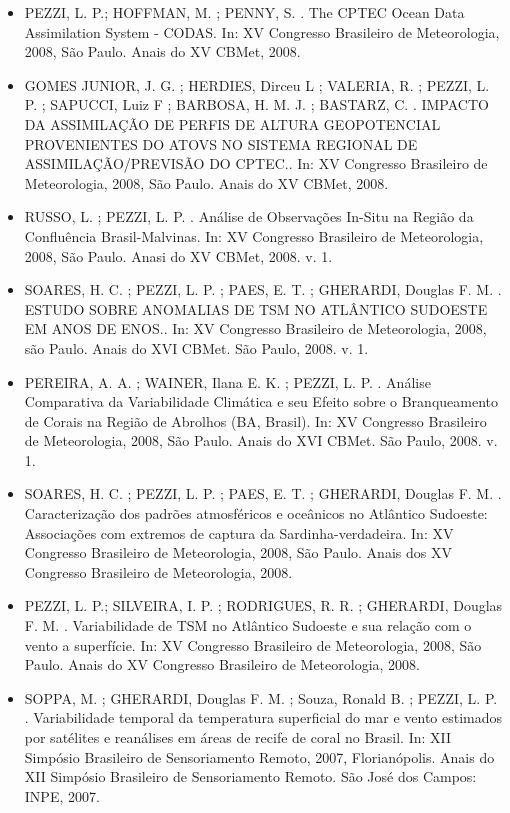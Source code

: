 \documentclass[11pt, a4paper]{awesome-cv}
\begin{document}
\begin{cvletter}
\begin{itemize}
  \item[] PEZZI, L. P.; HOFFMAN, M. ; PENNY, S. . The CPTEC Ocean Data Assimilation System - CODAS. In: XV Congresso Brasileiro de Meteorologia, 2008, São Paulo. Anais do XV CBMet, 2008.
  \item[] GOMES JUNIOR, J. G. ; HERDIES, Dirceu L ; VALERIA, R. ; PEZZI, L. P. ; SAPUCCI, Luiz F ; BARBOSA, H. M. J. ; BASTARZ, C. . IMPACTO DA ASSIMILAÇÃO DE PERFIS DE ALTURA GEOPOTENCIAL PROVENIENTES DO ATOVS NO SISTEMA REGIONAL DE ASSIMILAÇÃO/PREVISÃO DO CPTEC.. In: XV Congresso Brasileiro de Meteorologia, 2008, São Paulo. Anais do XV CBMet, 2008. 
  \item[] RUSSO, L. ; PEZZI, L. P. . Análise de Observações In-Situ na Região da Confluência Brasil-Malvinas. In: XV Congresso Brasileiro de Meteorologia, 2008, São Paulo. Anasi do XV CBMet, 2008. v. 1. 
  \item[] SOARES, H. C. ; PEZZI, L. P. ; PAES, E. T. ; GHERARDI, Douglas F. M. . ESTUDO SOBRE ANOMALIAS DE TSM NO ATLÂNTICO SUDOESTE EM ANOS DE ENOS.. In: XV Congresso Brasileiro de Meteorologia, 2008, são Paulo. Anais do XVI CBMet. São Paulo, 2008. v. 1. 
  \item[] PEREIRA, A. A. ; WAINER, Ilana E. K. ; PEZZI, L. P. . Análise Comparativa da Variabilidade Climática e seu Efeito sobre o Branqueamento de Corais na Região de Abrolhos (BA, Brasil). In: XV Congresso Brasileiro de Meteorologia, 2008, São Paulo. Anais do XVI CBMet. São Paulo, 2008. v. 1.
  \item[] SOARES, H. C. ; PEZZI, L. P. ; PAES, E. T. ; GHERARDI, Douglas F. M. . Caracterização dos padrões atmosféricos e oceânicos no Atlântico Sudoeste: Associações com extremos de captura da Sardinha-verdadeira. In: XV Congresso Brasileiro de Meteorologia, 2008, São Paulo. Anais dos XV Congresso Brasileiro de Meteorologia, 2008.
  \item[] PEZZI, L. P.; SILVEIRA, I. P. ; RODRIGUES, R. R. ; GHERARDI, Douglas F. M. . Variabilidade de TSM no Atlântico Sudoeste e sua relação com o vento a superfície. In: XV Congresso Brasileiro de Meteorologia, 2008, São Paulo. Anais do XV Congresso Brasileiro de Meteorologia, 2008. 
  \item[] SOPPA, M. ; GHERARDI, Douglas F. M. ; Souza, Ronald B. ; PEZZI, L. P. . Variabilidade temporal da temperatura superficial do mar e vento estimados por satélites e reanálises em áreas de recife de coral no Brasil. In: XII Simpósio Brasileiro de Sensoriamento Remoto, 2007, Florianópolis. Anais do XII Simpósio Brasileiro de Sensoriamento Remoto. São José dos Campos: INPE, 2007. 

\end{itemize}
\end{cvletter}
\end{document}
